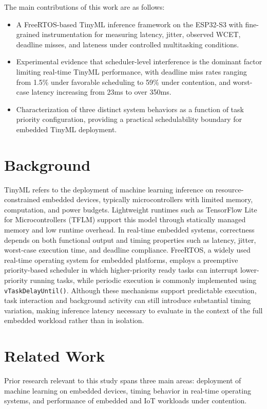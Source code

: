 \documentclass[conference]{IEEEtran}
\begin{document}
The main contributions of this work are as follows:
\begin{itemize}
    \item A FreeRTOS-based TinyML inference framework on the ESP32-S3 with fine-grained instrumentation for measuring latency, jitter, observed WCET, deadline misses, and lateness under controlled multitasking conditions. %
    \item Experimental evidence that scheduler-level interference is the dominant factor limiting real-time TinyML performance, with deadline miss rates ranging from 1.5\% under favorable scheduling to 59\% under contention, and worst-case latency increasing from 23ms to over 350ms.
    \item Characterization of three distinct system behaviors as a function of task priority configuration, providing a practical schedulability boundary for embedded TinyML deployment.
\end{itemize}

\section{Background}

TinyML refers to the deployment of machine learning inference on resource-constrained embedded devices, typically microcontrollers with limited memory, computation, and power budgets. Lightweight runtimes such as TensorFlow Lite for Microcontrollers (TFLM) support this model through statically managed memory and low runtime overhead. In real-time embedded systems, correctness depends on both functional output and timing properties such as latency, jitter, worst-case execution time, and deadline compliance. FreeRTOS, a widely used real-time operating system for embedded platforms, employs a preemptive priority-based scheduler in which higher-priority ready tasks can interrupt lower-priority running tasks, while periodic execution is commonly implemented using \texttt{vTaskDelayUntil()}. Although these mechanisms support predictable execution, task interaction and background activity can still introduce substantial timing variation, making inference latency necessary to evaluate in the context of the full embedded workload rather than in isolation.

\section{Related Work}

Prior research relevant to this study spans three main areas: deployment of machine learning on embedded devices, timing behavior in real-time operating systems, and performance of embedded and IoT workloads under contention.
\end{document}
